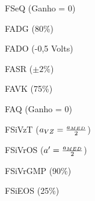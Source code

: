 \begin{figure}[htb]
\footnotesize
\centering

\vspace{1cm}
\caption{FSeQ (Ganho = 0)}
\label{fig:fseq}
\end{figure}

\begin{figure}[htb]
\footnotesize
\centering

\vspace{1cm}
\caption{FADG (80\%)}
\label{fig:fadg}
\end{figure}

\begin{figure}[htb]
\footnotesize
\centering

\vspace{1cm}
\caption{FADO (-0,5 Volts)}
\label{fig:fado}
\end{figure}

\begin{figure}[htb]
\footnotesize
\centering

\vspace{1cm}
\caption{FASR ($\pm 2\%$)}
\label{fig:fasr}
\end{figure}

\begin{figure}[htb]
\footnotesize
\centering

\vspace{1cm}
\caption{FAVK (75\%)}
\label{fig:favk}
\end{figure}

\begin{figure}[htb]
\footnotesize
\centering

\vspace{1cm}
\caption{FAQ (Ganho = 0)}
\label{fig:faq}
\end{figure}

\begin{figure}[htb]
\footnotesize
\centering

\vspace{1cm}
\caption{FSiVzT ($a_{\tiny VZ} = \frac{a_{\tiny MED}}{2}$)}
\label{fig:fsivzt}
\end{figure}

\begin{figure}[htb]
\footnotesize
\centering

\vspace{1cm}
\caption{FSiVrOS ($a' = \frac{a_{\tiny MED}}{2}$)}
\label{fig:fsivros}
\end{figure}

\begin{figure}[htb]
\footnotesize
\centering

\vspace{1cm}
\caption{FSiVrGMP (90\%)}
\label{fig:fsivrgmp}
\end{figure}

\begin{figure}[htb]
\footnotesize
\centering

\vspace{1cm}
\caption{FSiEOS (25\%)}
\label{fig:fsieos}
\end{figure}
